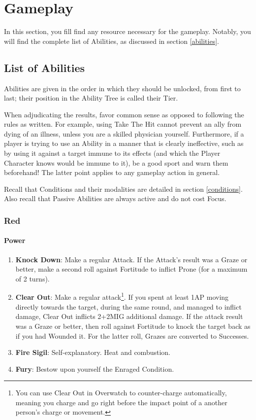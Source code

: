 \chapter{Gameplay}

In this section, you fill find any resource necessary for the gameplay. Notably, you will find the complete list of Abilities, as discussed in section \ref{abilities}.

\section{List of Abilities}
\label{abilities_list}

Abilities are given in the order in which they should be unlocked, from first to last; their position in the Ability Tree is called their Tier. 

When adjudicating the results, favor common sense as opposed to following the rules as written. For example, using Take The Hit cannot prevent an ally from dying of an illness, unless you are a skilled physician yourself. Furthermore, if a player is trying to use an Ability in a manner that is clearly ineffective, such as by using it against a target immune to its effects (and which the Player Character knows would be immune to it), be a good sport and warn them beforehand! The latter point applies to any gameplay action in general.

Recall that Conditions and their modalities are detailed in section \ref{conditions}. Also recall that Passive Abilities are always active and do not cost Focus.

\subsection{Red}

\subsubsection{Power}
\begin{enumerate}
    \item \textbf{Knock Down}: Make a regular Attack. If the Attack's result was a Graze or better, make a second roll against Fortitude to inflict Prone (for a maximum of 2 turns).
    \item \textbf{Clear Out}: Make a regular attack\footnote{You can use Clear Out in Overwatch to counter-charge automatically, meaning you charge and go right before the impact point of a another person's charge or movement.}. If you spent at least 1AP moving directly towards the target, during the same round, and managed to inflict damage, Clear Out inflicts 2+2\texttimes MIG additional damage. If the attack result was a Graze or better, then roll against Fortitude to knock the target back as if you had Wounded it. For the latter roll, Grazes are converted to Successes.
    \item \textbf{Fire Sigil}: Self-explanatory. Heat and combustion.
    \item \textbf{Fury}: Bestow upon yourself the Enraged Condition.
\end{enumerate}

